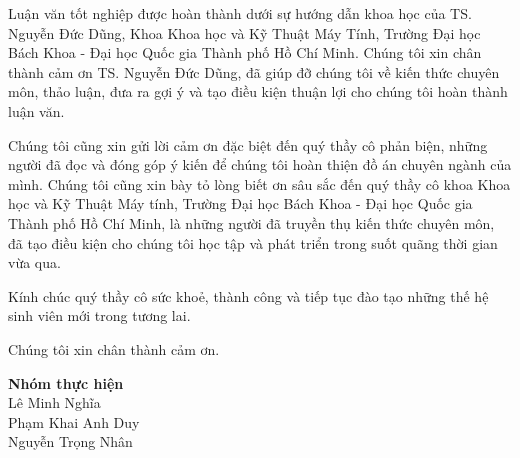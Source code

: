 \begin{acknowledgments}

    Luận văn tốt nghiệp được hoàn thành dưới sự hướng dẫn khoa học của TS. Nguyễn Đức Dũng, Khoa Khoa học và Kỹ Thuật Máy Tính, Trường Đại học Bách Khoa - Đại học Quốc gia Thành phố Hồ Chí Minh. Chúng tôi xin chân thành cảm ơn TS. Nguyễn Đức Dũng, đã giúp đỡ chúng tôi về kiến thức chuyên môn, thảo luận, đưa ra gợi ý và tạo điều kiện thuận lợi cho chúng tôi hoàn thành luận văn.

    Chúng tôi cũng xin gửi lời cảm ơn đặc biệt đến quý thầy cô phản biện, những người đã đọc và đóng góp ý kiến để chúng tôi hoàn thiện đồ án chuyên ngành của mình. Chúng tôi cũng xin bày tỏ lòng biết ơn sâu sắc đến quý thầy cô khoa Khoa học và Kỹ Thuật Máy tính, Trường Đại học Bách Khoa - Đại học Quốc gia Thành phố Hồ Chí Minh, là những người đã truyền thụ kiến thức chuyên môn, đã tạo điều kiện cho chúng tôi học tập và phát triển trong suốt quãng thời gian vừa qua.

    Kính chúc quý thầy cô sức khoẻ, thành công và tiếp tục đào tạo những thế hệ sinh viên mới trong tương lai.

    Chúng tôi xin chân thành cảm ơn.

    \begin{flushright}
        \textbf{Nhóm thực hiện} \\
        Lê Minh Nghĩa \\
        Phạm Khai Anh Duy \\
        Nguyễn Trọng Nhân \\
    \end{flushright}

\end{acknowledgments}